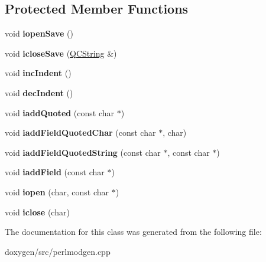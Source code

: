 \subsection*{Protected Member Functions}
\begin{DoxyCompactItemize}
\item 
\mbox{\label{class_perl_mod_output_a1bb2b1fa2bff81a44cf22ff102269603}} 
void {\bfseries iopen\+Save} ()
\item 
\mbox{\label{class_perl_mod_output_a4901c7204a33d4f67fa58ca0a1590ef8}} 
void {\bfseries iclose\+Save} (\mbox{\hyperlink{class_q_c_string}{Q\+C\+String}} \&)
\item 
\mbox{\label{class_perl_mod_output_af64a9ea9387cf24ececa9948fc6c51bf}} 
void {\bfseries inc\+Indent} ()
\item 
\mbox{\label{class_perl_mod_output_a87ca2eea3d930eb4fe5f34363fb4483c}} 
void {\bfseries dec\+Indent} ()
\item 
\mbox{\label{class_perl_mod_output_a35764c31d12ed31d82048af9560b5820}} 
void {\bfseries iadd\+Quoted} (const char $\ast$)
\item 
\mbox{\label{class_perl_mod_output_a82ffa33e722fd3168f484d77ec83cf26}} 
void {\bfseries iadd\+Field\+Quoted\+Char} (const char $\ast$, char)
\item 
\mbox{\label{class_perl_mod_output_a1cce3e0acdb2935716bca276b38b92da}} 
void {\bfseries iadd\+Field\+Quoted\+String} (const char $\ast$, const char $\ast$)
\item 
\mbox{\label{class_perl_mod_output_af7bacddb6455f3a0d604e42773665a81}} 
void {\bfseries iadd\+Field} (const char $\ast$)
\item 
\mbox{\label{class_perl_mod_output_a9a67e943b2fbe59bbc25825b6a2d3f93}} 
void {\bfseries iopen} (char, const char $\ast$)
\item 
\mbox{\label{class_perl_mod_output_ac586a81a61a46b23f708aa2cf9f4e2e0}} 
void {\bfseries iclose} (char)
\end{DoxyCompactItemize}


The documentation for this class was generated from the following file\+:\begin{DoxyCompactItemize}
\item 
doxygen/src/perlmodgen.\+cpp\end{DoxyCompactItemize}
